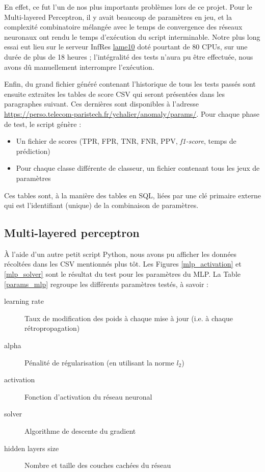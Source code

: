 \documentclass[a4paper]{report}
\begin{document}
En effet, ce fut l'un de nos plus importants problèmes lors de ce projet. Pour le Multi-layered Perceptron, il y avait beaucoup de paramètres en jeu, et la complexité combinatoire mélangée avec le temps de convergence des réseaux neuronaux ont rendu le temps d'exécution du script interminable. Notre plus long essai eut lieu sur le serveur InfRes \href{http://lame10.enst.fr}{lame10} doté pourtant de 80 CPUs, sur une durée de plus de 18 heures ; l'intégralité des tests n'aura pu être effectuée, nous avons dû manuellement interrompre l'exécution.

Enfin, du grand fichier généré contenant l'historique de tous les tests passés sont ensuite extraites les tables de score CSV qui seront présentées dans les paragraphes suivant. Ces dernières sont disponibles à l'adresse \url{https://perso.telecom-paristech.fr/ychalier/anomaly/params/}. Pour chaque phase de test, le script génère :
\begin{itemize}
\item Un fichier de scores (TPR, FPR, TNR, FNR, PPV, \emph{f1-score}, temps de prédiction)
\item Pour chaque classe différente de classeur, un fichier contenant tous les jeux de paramètres
\end{itemize}
Ces tables sont, à la manière des tables en SQL, liées par une clé primaire externe qui est l'identifiant (unique) de la combinaison de paramètres.


\subsection{Multi-layered perceptron}

\label{section:mlp}

À l'aide d'un autre petit script Python, nous avons pu afficher les données récoltées dans les CSV mentionnés plus tôt. Les Figures \ref{mlp_activation} et \ref{mlp_solver} sont le résultat du test pour les paramètres du MLP. La Table \ref{params_mlp} regroupe les différents paramètres testés, à savoir :
\begin{description}
\item[learning rate] Taux de modification des poids à chaque mise à jour (i.e. à chaque rétropropagation)
\item[alpha] Pénalité de régularisation (en utilisant la norme $l_2$)
\item[activation] Fonction d'activation du réseau neuronal
\item[solver] Algorithme de descente du gradient
\item[hidden layers size] Nombre et taille des couches cachées du réseau
\end{description}
\end{document}
